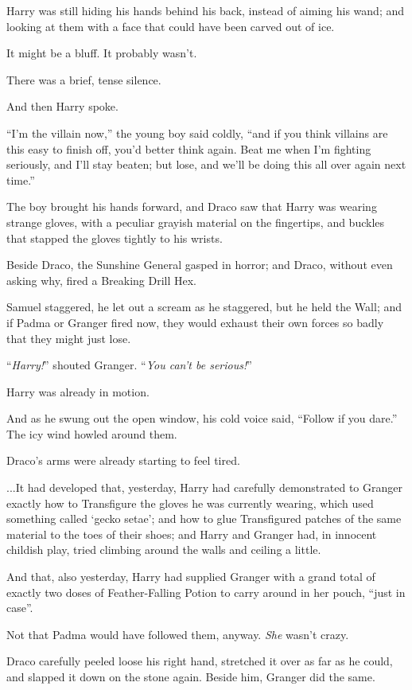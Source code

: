 Harry was still hiding his hands behind his back, instead of aiming his wand; and looking at them with a face that could have been carved out of ice.

It might be a bluff. It probably wasn’t.

There was a brief, tense silence.

And then Harry spoke.

“I’m the villain now,” the young boy said coldly, “and if you think villains are this easy to finish off, you’d better think again. Beat me when I’m fighting seriously, and I’ll stay beaten; but lose, and we’ll be doing this all over again next time.”

The boy brought his hands forward, and Draco saw that Harry was wearing strange gloves, with a peculiar grayish material on the fingertips, and buckles that stapped the gloves tightly to his wrists.

Beside Draco, the Sunshine General gasped in horror; and Draco, without even asking why, fired a Breaking Drill Hex.

Samuel staggered, he let out a scream as he staggered, but he held the Wall; and if Padma or Granger fired now, they would exhaust their own forces so badly that they might just lose.

“\emph{Harry!}” shouted Granger. “\emph{You can’t be serious!}”

Harry was already in motion.

And as he swung out the open window, his cold voice said, “Follow if you dare.”
\sbreak
The icy wind howled around them.

Draco’s arms were already starting to feel tired.

...It had developed that, yesterday, Harry had carefully demonstrated to Granger exactly how to Transfigure the gloves he was currently wearing, which used something called ‘gecko setae’; and how to glue Transfigured patches of the same material to the toes of their shoes; and Harry and Granger had, in innocent childish play, tried climbing around the walls and ceiling a little.

And that, also yesterday, Harry had supplied Granger with a grand total of exactly two doses of Feather-Falling Potion to carry around in her pouch, “just in case”.

Not that Padma would have followed them, anyway. \emph{She} wasn’t crazy.

Draco carefully peeled loose his right hand, stretched it over as far as he could, and slapped it down on the stone again. Beside him, Granger did the same.

